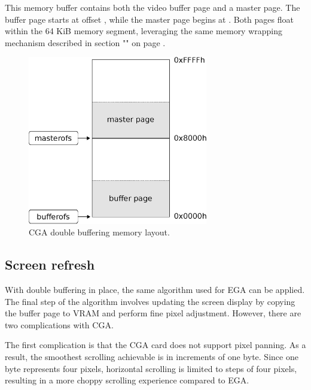 \documentclass[book.tex]{subfiles}
\begin{document}
\par
\begin{minipage}{\textwidth}
  
\end{minipage}
\label{state_type}
\par
This memory buffer contains both the video buffer page and a master page. The buffer page starts at offset , while the master page begins at . Both pages float within the 64 KiB memory segment, leveraging the same memory wrapping mechanism described in section "" on page \pageref{section:wrap_ega_memory}.\\

\begin{figure}[H]
\centering
\includegraphics[width=0.7\textwidth]{imgs/drawings/cga_screenseg.eps}
\caption{CGA double buffering memory layout.}
\label{fig:cga_screenseg}
\end{figure}

\bigskip
\subsection{Screen refresh}
With double buffering in place, the same algorithm used for EGA can be applied. The final step of the algorithm involves updating the screen display by copying the buffer page to VRAM and perform fine pixel adjustment. However, there are two complications with CGA.\\

\par
The first complication is that the CGA card does not support pixel panning. As a result, the smoothest scrolling achievable is in increments of one byte. Since one byte represents four pixels, horizontal scrolling is limited to steps of four pixels, resulting in a more choppy scrolling experience compared to EGA. \\
\end{document}
